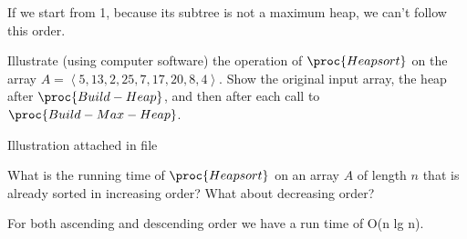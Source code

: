 \documentclass[11pt,addpoints]{exam}
\begin{document}
\begin{questions}
\begin{center}
	If we start from 1, because its subtree is not a maximum heap, we can't follow this order.
\end{center}

\ifprintanswers
\newpage
\else
\bigskip
\fi
	
	
%
\question[10]
Illustrate (using computer software) the operation of $\proc{Heapsort}$ on the array $A = \left< 5, 13, 2, 25, 7, 17, 20, 8, 4 \right>$.  Show the original input array, the heap after $\proc{Build-Heap}$, and then after each call to $\proc{Build-Max-Heap}$.

\begin{center}	
	Illustration attached in file
\end{center}

\ifprintanswers
\newpage
\else
\bigskip
\fi
	
	
%
\question[5]
What is the running time of $\proc{Heapsort}$ on an array $A$ of length $n$ that is already sorted in increasing order?  What about decreasing order?

\begin{center}	
For both ascending and descending order we have a run time of O(n lg n).
\end{center}


%
\end{questions}
\end{document}
